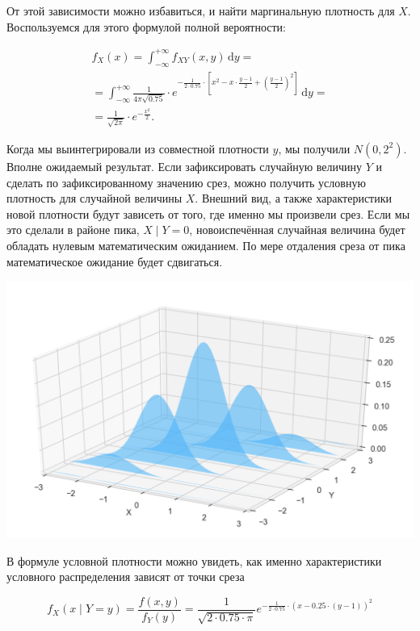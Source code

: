 \documentclass[12pt, a4paper, oneside]{extreport}
\newcommand{\dx}[1]{\,\mathrm{d}#1} %
\theoremstyle{plain}              %
\theoremstyle{definition}         %
\begin{document}
От этой зависимости можно избавиться, и найти маргинальную плотность для $X$. Воспользуемся для этого формулой полной вероятности: 

\begin{multline*}
f_X(x) = \int_{-\infty}^{+\infty} f_{XY}(x,y) \dx{y} = \\ = \int_{-\infty}^{+\infty} \frac{1}{4 \pi \sqrt{0.75}} \cdot e^{-\frac{1}{2 \cdot 0.75} \cdot \left[ x^2 - x \cdot \frac{y - 1}{2} + \left( \frac{y - 1}{2}    \right)^2   \right]} \dx{y}  = \\ = \frac{1}{\sqrt{2 \pi} }\cdot e^{-\frac{x^2}{2}}.
\end{multline*}

Когда мы выинтегрировали из совместной плотности $y$, мы получили $N(0,2^2)$. Вполне ожидаемый результат.  Если зафиксировать случайную величину $Y$ и сделать по зафиксированному значению срез, можно получить условную плотность для случайной величины $X$.  Внешний вид, а также характеристики новой плотности  будут зависеть от того, где именно мы произвели срез. Если мы это сделали в районе пика, $X \mid Y=0$,  новоиспечённая случайная величина будет обладать нулевым математическим ожиданием. По мере отдаления среза от пика математическое ожидание будет сдвигаться. 

\begin{center}
	\includegraphics[scale=0.22]{two_normal_3.png}
\end{center}

В формуле условной плотности можно увидеть, как именно характеристики условного распределения зависят от точки среза

\[
f_X(x \mid Y = y)  = \frac{f(x,y)}{f_Y(y)} = \frac{1}{\sqrt{2 \cdot 0.75 \cdot \pi}} e^{-\frac{1}{2 \cdot 0.75} \cdot(x - 0.25 \cdot(y-1))^2}
\]
\end{document}
